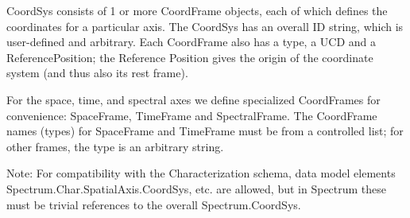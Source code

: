 \documentclass[11pt]{article}
\begin{document}
  CoordSys consists of 1 or more CoordFrame objects, each of which defines
the coordinates for a particular axis. The CoordSys has an overall ID string,
which is user-defined and arbitrary. 
Each CoordFrame also has a type, a UCD and a ReferencePosition; the Reference
Position gives the origin of the coordinate system (and thus also its rest frame).

For the space, time, and spectral axes we define specialized CoordFrames
for convenience: SpaceFrame, TimeFrame and SpectralFrame. The
CoordFrame names (types) for SpaceFrame and TimeFrame must be from a
controlled list; for other frames, the type is an arbitrary string.

Note: For compatibility with the Characterization schema, data model
elements Spectrum.Char.SpatialAxis.CoordSys, etc. are allowed, but
in Spectrum these must be trivial references to the overall
Spectrum.CoordSys.


\setcounter{table}{3}
\end{document}
